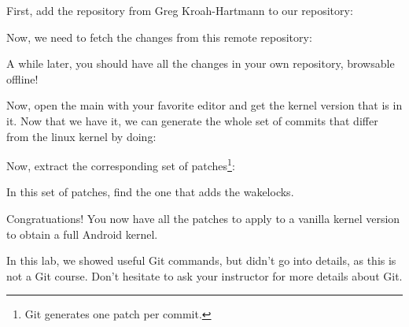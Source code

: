 First, add the  repository from Greg Kroah-Hartmann to our
repository:


Now, we need to fetch the changes from this remote repository:


A while later, you should have all the changes in your own repository, browsable
offline!

Now, open the main  with your favorite editor and get the kernel version
that is in it. Now that we have it, we can generate the whole set of commits that
differ from the linux kernel by doing:


Now, extract the corresponding set of patches\footnote{Git generates one patch per commit.}:


In this set of patches, find the one that adds the wakelocks.

Congratuations! You now have all the patches to apply to a vanilla kernel version to obtain a
full Android kernel.

In this lab, we showed useful Git commands, but didn't go into details, as this is not a Git course. Don't
hesitate to ask your instructor for more details about Git.
